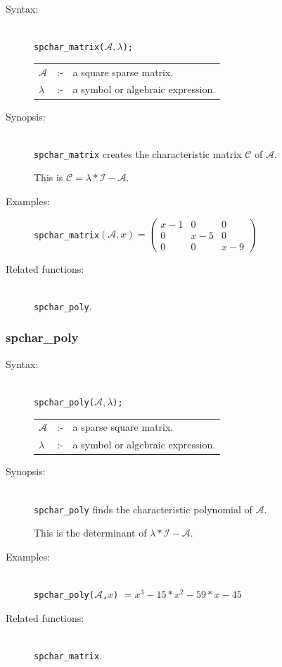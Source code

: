 \begin{description}
\item[Syntax:]\mbox{}\\
{\tt spchar\_matrix($\mathcal{A},\lambda$);}\\[2mm]
\begin{tabular}{l l l}
$\mathcal{A}$ &:-& a square sparse matrix. \\
$\lambda$  &:-& a symbol or algebraic expression.
\end{tabular}

\item[Synopsis:]\mbox{}\\
\texttt{spchar\_matrix} creates the characteristic matrix $\mathcal{C}$ of
$\mathcal{A}$.

This is $\mathcal{C} = \lambda * \mathcal{I} - \mathcal{A}$.

\item[Examples:]
\texttt{spchar\_matrix}\((\mathcal{A},x) =
\begin{pmatrix} x-1 & 0 & 0 \\ 0 & x-5 & 0 \\ 0 & 0 & x-9 \end{pmatrix}\)

\item[Related functions:]\mbox{}\\
\texttt{spchar\_poly}.
\end{description}

\subsubsection{spchar\_poly}
\label{sparse:spchar_poly}
\hypertarget{operator:SPCHAR_POLY}{}

\begin{description}
\item[Syntax:]\mbox{}\\
{\tt spchar\_poly($\mathcal{A},\lambda$);}\\[2mm]
\begin{tabular}{l l l}
$\mathcal{A}$ &:-& a sparse square matrix. \\
$\lambda$ &:-& a symbol or algebraic expression.
\end{tabular}

\item[Synopsis:]\mbox{}\\
\texttt{spchar\_poly} finds the characteristic polynomial of
                $\mathcal{A}$.

This is the determinant of $\lambda * \mathcal{I} - \mathcal{A}$.

\item[Examples:]\mbox{}\\
{\tt spchar\_poly($\mathcal{A}$,$x$)} $= x^3-15*x^2-59*x-45$

\item[Related functions:]\mbox{}\\
\texttt{spchar\_matrix}.
\end{description}


